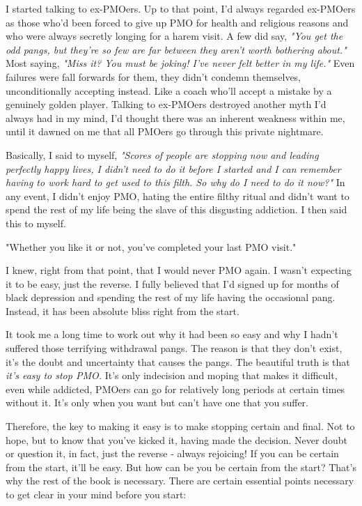 \documentclass[easypeasy]{subfiles}
\begin{document}
I started talking to ex-PMOers. Up to that point, I'd always regarded ex-PMOers as those who'd been forced to give up PMO for health and religious reasons and who were always secretly longing for a harem visit. A few did say, \textit{"You get the odd pangs, but they're so few are far between they aren't worth bothering about."} Most saying, \textit{"Miss it? You must be joking! I've never felt better in my life."} Even failures were fall forwards for them, they didn't condemn themselves, unconditionally accepting instead. Like a coach who'll accept a mistake by a genuinely golden player. Talking to ex-PMOers destroyed another myth I'd always had in my mind, I'd thought there was an inherent weakness within me, until it dawned on me that all PMOers go through this private nightmare.

Basically, I said to myself, \textit{"Scores of people are stopping now and leading perfectly happy lives, I didn't need to do it before I started and I can remember having to work hard to get used to this filth. So why do I need to do it now?"} In any event, I didn't enjoy PMO, hating the entire filthy ritual and didn't want to spend the rest of my life being the slave of this disgusting addiction. I then said this to myself.

  {\Large "Whether you like it or not, you've completed your last PMO visit."}

I knew, right from that point, that I would never PMO again. I wasn't expecting it to be easy, just the reverse. I fully believed that I'd signed up for months of black depression and spending the rest of my life having the occasional pang. Instead, it has been absolute bliss right from the start.

It took me a long time to work out why it had been so easy and why I hadn't suffered those terrifying withdrawal pangs. The reason is that they don't exist, it's the doubt and uncertainty that causes the pangs. The beautiful truth is that \textit{it's easy to stop PMO.} It's only indecision and moping that makes it difficult, even while addicted, PMOers can go for relatively long periods at certain times without it. It's only when you want but can't have one that you suffer.

Therefore, the key to making it easy is to make stopping certain and final. Not to hope, but to know that you've kicked it, having made the decision. Never doubt or question it, in fact, just the reverse - always rejoicing! If you can be certain from the start, it'll be easy. But how can be you be certain from the start? That's why the rest of the book is necessary. There are certain essential points necessary to get clear in your mind before you start:
\end{document}
